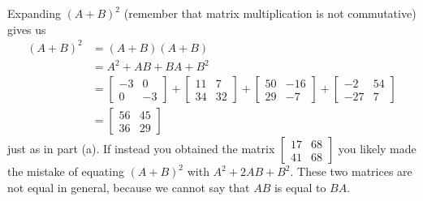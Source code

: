 \begin{example}
\item Expanding $(A+B)^2$ (remember that matrix multiplication is not commutative) gives us
\begin{align*}
(A+B)^2 &= (A+B)(A+B) \\
	&= A^2 + AB + BA + B^2 \\
	&= \left[ \begin{array}{rr} -3&0 \\ 0&-3 \end{array} \right] +  \left[ \begin{array}{cc} 11&7 \\ 34&32 \end{array} \right] +  \left[ \begin{array}{cr} 50&-16 \\ 29&-7 \end{array} \right] +  \left[ \begin{array}{rc} -2&54 \\ -27&7 \end{array} \right] \\
	&=  \left[ \begin{array}{cc} 56&45 \\ 36&29 \end{array} \right] 
\end{align*}
just as in part (a). If instead you obtained the matrix  $\left[ \begin{array}{cc} 17&68 \\41&68 \end{array} \right]$ you likely made the mistake of equating $(A+B)^2$ with $A^2+2AB+B^2$. These two matrices are not equal in general, because we cannot say that $AB$ is equal to $BA$. 

\ea
	
\end{example}

\label{sec:mtx_ops_summ}

